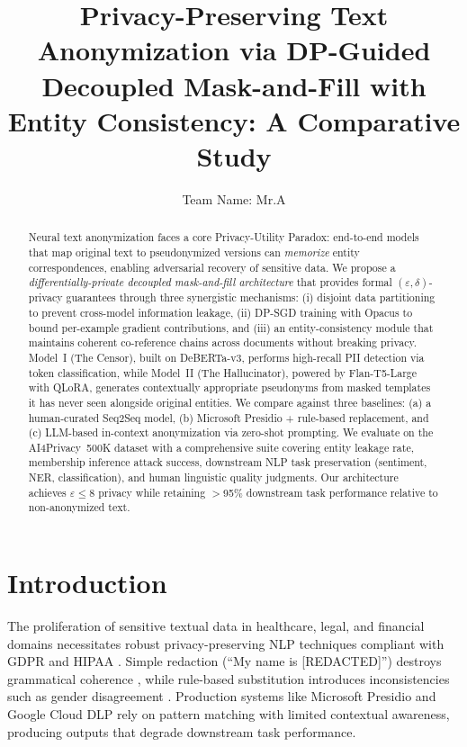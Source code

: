 \documentclass[9pt]{article}
\title{Privacy-Preserving Text Anonymization via DP-Guided Decoupled Mask-and-Fill with Entity Consistency: A Comparative Study}
\author{Team Name: Mr.A}
\begin{document}
\maketitle

\begin{abstract}
Neural text anonymization faces a core Privacy-Utility Paradox: end-to-end models that map original text to pseudonymized versions can \textit{memorize} entity correspondences, enabling adversarial recovery of sensitive data. We propose a \textit{differentially-private decoupled mask-and-fill architecture} that provides formal $(\varepsilon, \delta)$-privacy guarantees through three synergistic mechanisms: (i) disjoint data partitioning to prevent cross-model information leakage, (ii) DP-SGD training with Opacus to bound per-example gradient contributions, and (iii) an entity-consistency module that maintains coherent co-reference chains across documents without breaking privacy. Model~I (The Censor), built on DeBERTa-v3, performs high-recall PII detection via token classification, while Model~II (The Hallucinator), powered by Flan-T5-Large with QLoRA, generates contextually appropriate pseudonyms from masked templates it has never seen alongside original entities. We compare against three baselines: (a) a human-curated Seq2Seq model, (b) Microsoft Presidio + rule-based replacement, and (c) LLM-based in-context anonymization via zero-shot prompting. We evaluate on the AI4Privacy~500K dataset with a comprehensive suite covering entity leakage rate, membership inference attack success, downstream NLP task preservation (sentiment, NER, classification), and human linguistic quality judgments. Our architecture achieves $\varepsilon \leq 8$ privacy while retaining $>$95\% downstream task performance relative to non-anonymized text.
\end{abstract}

\section{Introduction}

The proliferation of sensitive textual data in healthcare, legal, and financial domains necessitates robust privacy-preserving NLP techniques compliant with GDPR and HIPAA \cite{gdpr2016, hipaa1996}. Simple redaction (``My name is [REDACTED]'') destroys grammatical coherence \cite{lison2021anonymisation}, while rule-based substitution introduces inconsistencies such as gender disagreement \cite{pilán2022ai4privacy}. Production systems like Microsoft Presidio \cite{presidio2023} and Google Cloud DLP rely on pattern matching with limited contextual awareness, producing outputs that degrade downstream task performance.
\end{document}
